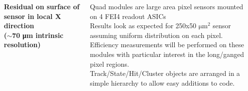 \documentclass{beamer}
\begin{document}
\begin{frame}
\begin{columns}[t]
\tiny{\textbf{Residual on surface of sensor in local X direction \\
 ($\sim$70 \si{\micro\metre} intrinsic resolution)}}

\tiny{
\vspace{10pt}
Quad modules are large area pixel sensors mounted on 4 FEI4 readout ASICs \\
\vspace{10pt}
Results look as expected for 250x50 $\si{\micro\metre\squared}$ sensor assuming uniform distribution on each pixel. \\
\vspace{10pt}
Efficiency measurements will be performed on these modules with particular interest in the long/ganged pixel regions. \\
\vspace{10pt}
Track/State/Hit/Cluster objects are arranged in a simple hierarchy to allow easy additions to code.\\
}
\end{columns}
\end{frame}
\end{document}
